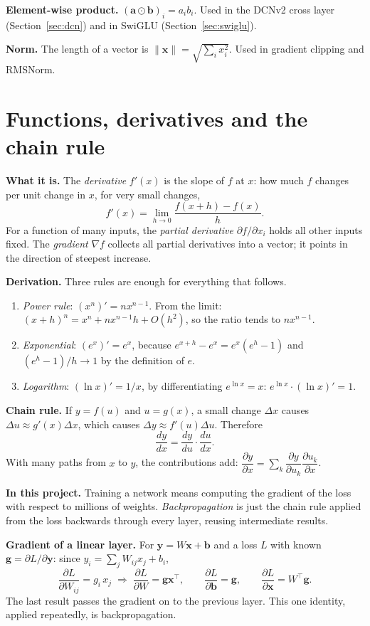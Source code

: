 \documentclass[10pt,a4paper]{article}
\newcommand{\what}[1]{\par\textbf{What it is.} #1}
\newcommand{\here}[1]{\par\textbf{In this project.} #1}
\newcommand{\deriv}{\par\textbf{Derivation.} }
\begin{document}
\textbf{Element-wise product.} $(\mathbf{a}\odot\mathbf{b})_i=a_ib_i$. Used in the DCNv2 cross layer (Section~\ref{sec:dcn}) and in SwiGLU (Section~\ref{sec:swiglu}).

\textbf{Norm.} The length of a vector is $\lVert\mathbf{x}\rVert=\sqrt{\sum_i x_i^2}$. Used in gradient clipping and RMSNorm.

\section{Functions, derivatives and the chain rule}
\what{The \emph{derivative} $f'(x)$ is the slope of $f$ at $x$: how much $f$ changes per unit change in $x$, for very small changes,
\[f'(x)=\lim_{h\to0}\frac{f(x+h)-f(x)}{h}.\]
For a function of many inputs, the \emph{partial derivative} $\partial f/\partial x_i$ holds all other inputs fixed. The \emph{gradient} $\nabla f$ collects all partial derivatives into a vector; it points in the direction of steepest increase.}

\deriv Three rules are enough for everything that follows.
\begin{enumerate}
\item \emph{Power rule}: $(x^n)'=nx^{n-1}$. From the limit: $(x+h)^n=x^n+nx^{n-1}h+O(h^2)$, so the ratio tends to $nx^{n-1}$.
\item \emph{Exponential}: $(e^x)'=e^x$, because $e^{x+h}-e^x=e^x(e^h-1)$ and $(e^h-1)/h\to1$ by the definition of $e$.
\item \emph{Logarithm}: $(\ln x)'=1/x$, by differentiating $e^{\ln x}=x$: $e^{\ln x}\cdot(\ln x)'=1$.
\end{enumerate}
\textbf{Chain rule.} If $y=f(u)$ and $u=g(x)$, a small change $\Delta x$ causes $\Delta u\approx g'(x)\Delta x$, which causes $\Delta y\approx f'(u)\Delta u$. Therefore
\[\frac{dy}{dx}=\frac{dy}{du}\cdot\frac{du}{dx}.\]
With many paths from $x$ to $y$, the contributions add: $\dfrac{\partial y}{\partial x}=\sum_k\dfrac{\partial y}{\partial u_k}\dfrac{\partial u_k}{\partial x}$.

\here{Training a network means computing the gradient of the loss with respect to millions of weights. \emph{Backpropagation} is just the chain rule applied from the loss backwards through every layer, reusing intermediate results.}

\textbf{Gradient of a linear layer.} For $\mathbf{y}=W\mathbf{x}+\mathbf{b}$ and a loss $L$ with known $\mathbf{g}=\partial L/\partial\mathbf{y}$: since $y_i=\sum_jW_{ij}x_j+b_i$,
\[\frac{\partial L}{\partial W_{ij}}=g_i\,x_j\;\Rightarrow\;\frac{\partial L}{\partial W}=\mathbf{g}\mathbf{x}^\top,\qquad \frac{\partial L}{\partial\mathbf{b}}=\mathbf{g},\qquad \frac{\partial L}{\partial\mathbf{x}}=W^\top\mathbf{g}.\]
The last result passes the gradient on to the previous layer. This one identity, applied repeatedly, is backpropagation.
\end{document}
